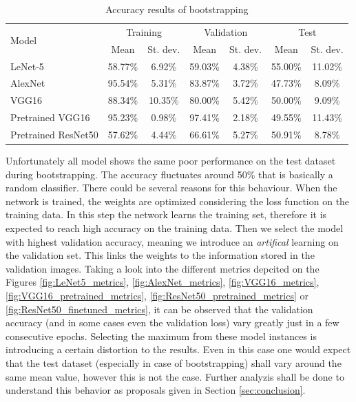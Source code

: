 \documentclass[10pt, final]{article}
\begin{document}
\begin{table}[!ht]
	\centering
	\begin{tabular}{l c c c c c c}
		\multirow{2}{*}{Model} & \multicolumn{2}{c}{Training} & \multicolumn{2}{c}{Validation} & \multicolumn{2}{c}{Test}                                 \\
		                       & Mean                         & St. dev.                       & Mean                     & St. dev. & Mean    & St. dev. \\
		\hline
		LeNet-5                & 58.77\%                      & 6.92\%                         & 59.03\%                  & 4.38\%   & 55.00\% & 11.02\%  \\
		AlexNet                & 95.54\%                      & 5.31\%                         & 83.87\%                  & 3.72\%   & 47.73\% & 8.09\%   \\
		VGG16                  & 88.34\%                      & 10.35\%                        & 80.00\%                  & 5.42\%   & 50.00\% & 9.09\%   \\
		Pretrained VGG16       & 95.23\%                      & 0.98\%                         & 97.41\%                  & 2.18\%   & 49.55\% & 11.43\%  \\
		Pretrained ResNet50    & 57.62\%                      & 4.44\%                         & 66.61\%                  & 5.27\%   & 50.91\% & 8.78\%   \\
		\hline
	\end{tabular}
	\caption{Accuracy results of bootstrapping}
	\label{table:bootstrap_results}
\end{table}

Unfortunately all model shows the same poor performance on the test dataset during bootstrapping.
The accuracy fluctuates around 50\% that is basically a random classifier.
There could be several reasons for this behaviour.
When the network is trained, the weights are optimized considering the loss function on the training data.
In this step the network learns the training set, therefore it is expected to reach high accuracy on the training data.
Then we select the model with highest validation accuracy, meaning we introduce an \emph{artifical} learning on the
validation set.
This links the weights to the information stored in the validation images.
Taking a look into the different metrics depcited on the Figures \ref{fig:LeNet5_metrics}, \ref{fig:AlexNet_metrics},
\ref{fig:VGG16_metrics}, \ref{fig:VGG16_pretrained_metrics}, \ref{fig:ResNet50_pretrained_metrics} or \ref{fig:ResNet50_finetuned_metrics},
it can be observed that the validation accuracy (and in some cases even the validation loss) vary greatly just
in a few consecutive epochs.
Selecting the maximum from these model instances is introducing a certain distortion to the results.
Even in this case one would expect that the test dataset (especially in case of bootstrapping) shall vary around the same
mean value, however this is not the case.
Further analyzis shall be done to understand this behavior as proposals given in Section \ref{sec:conclusion}.
\end{document}
